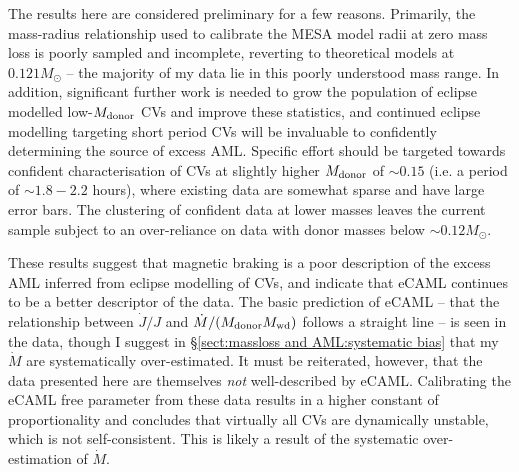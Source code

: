 The results here are considered preliminary for a few reasons. Primarily, the mass-radius relationship used to calibrate the MESA model radii at zero mass loss is poorly sampled and incomplete, reverting to theoretical models at $0.121 M_\odot$ -- the majority of my data lie in this poorly understood mass range.
In addition, significant further work is needed to grow the population of eclipse modelled low-$M_{\rm donor}$ CVs and improve these statistics, and continued eclipse modelling targeting short period CVs will be invaluable to confidently determining the source of excess AML.
Specific effort should be targeted towards confident characterisation of CVs at slightly higher $M_{\rm donor}$ of $\sim0.15$ (i.e. a period of $\sim 1.8 - 2.2$ hours), where existing data are somewhat sparse and have large error bars. The clustering of confident data at lower masses leaves the current sample subject to an over-reliance on data with donor masses below $\sim 0.12 M_\odot$.

These results suggest that magnetic braking is a poor description of the excess AML inferred from eclipse modelling of CVs, and indicate that eCAML continues to be a better descriptor of the data.
The basic prediction of eCAML -- that the relationship between $\dot J / J$ and $\dot M / (M_{\rm donor} M_{\rm wd})$ follows a straight line -- is seen in the data, though I suggest in \S\ref{sect:massloss and AML:systematic bias} that my $\dot M$ are systematically over-estimated.
It must be reiterated, however, that the data presented here are themselves \textit{not} well-described by eCAML.
 Calibrating the eCAML free parameter from these data results in a higher constant of proportionality and concludes that virtually all CVs are dynamically unstable, which is not self-consistent. This is likely a result of the systematic over-estimation of $\dot M$.


